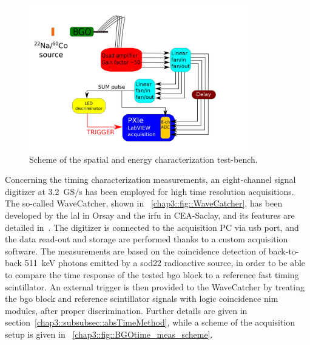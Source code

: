 \begin{figure} [!h]
\centering
\includegraphics[width=0.85\textwidth]{03_GraphicFiles/chapter3_CLaRySproto/Absorber/images/daq_calib_scheme.png}
\caption{Scheme of the spatial and energy characterization test-bench.}
\label{chap3::fig::space_en_meas_scheme}
\end{figure}

Concerning the timing characterization measurements, an eight-channel signal digitizer at 3.2~GS/s has been employed for high time resolution acquisitions. The so-called WaveCatcher, shown in \figurename~\ref{chap3::fig::WaveCatcher}, has been developed by the \gls{lal} in Orsay and the \gls{irfu} in CEA-Saclay, and its features are detailed in~\cite{Breton2014}. The digitizer is connected to the acquisition PC via \gls{usb} port, and the data read-out and storage are performed thanks to a custom acquisition software.  The measurements are based on the coincidence detection of back-to-back 511~keV photons emitted by a \gls{sod22} radioactive source, in order to be able to compare the time response of the tested \gls{bgo} block to a reference fast timing scintillator. An external trigger is then provided to the WaveCatcher by treating the \gls{bgo} block and reference scintillator signals with logic coincidence \gls{nim} modules, after proper discrimination. Further details are given in section~\ref{chap3::subsubsec::absTimeMethod}, while a scheme of the acquisition setup is given in \figurename~\ref{chap3::fig::BGOtime_meas_scheme}.

